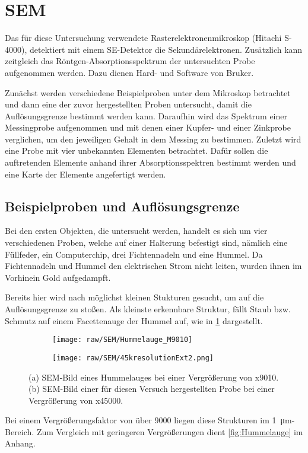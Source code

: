 \section{SEM}

	Das für diese Untersuchung verwendete Rasterelektronenmikroskop (Hitachi S-4000), detektiert mit einem SE-Detektor die Sekundärelektronen.
	Zusätzlich kann zeitgleich das Röntgen-Absorptionsspektrum der untersuchten Probe aufgenommen werden.
	Dazu dienen Hard- und Software von Bruker\cite{bruker}.

	Zunächst werden verschiedene Beispielproben unter dem Mikroskop betrachtet und dann eine der zuvor hergestellten Proben untersucht, damit die Auflösungsgrenze bestimmt werden kann.
	Daraufhin wird das Spektrum einer Messingprobe aufgenommen und mit denen einer Kupfer- und einer Zinkprobe verglichen, um den jeweiligen Gehalt in dem Messing zu bestimmen.
	Zuletzt wird eine Probe mit vier unbekannten Elementen betrachtet.
	Dafür sollen die auftretenden Elemente anhand ihrer Absorptionsspektren bestimmt werden und eine Karte der Elemente angefertigt werden.

\subsection{Beispielproben und Auflösungsgrenze} %

	Bei den ersten Objekten, die untersucht werden, handelt es sich um vier verschiedenen Proben, welche auf einer Halterung befestigt sind, nämlich eine Füllfeder, ein Computerchip, drei Fichtennadeln und eine Hummel.
	Da Fichtennadeln und Hummel den elektrischen Strom nicht leiten, wurden ihnen im Vorhinein Gold aufgedampft.

	Bereits hier wird nach möglichst kleinen Stukturen gesucht, um auf die Auflösungsgrenze zu stoßen.
	Als kleinste erkennbare Struktur, fällt Staub bzw. Schmutz auf einem Facettenauge der Hummel auf, wie in \cref{fig:Hummelaugex9010} dargestellt.

	\begin{figure}[ht]
		\centering
		\begin{subfigure}[c]{.45\textwidth}
			\centering
			\texttt{[image: raw/SEM/Hummelauge\_M9010]}
			\subcaption{}
			\label{fig:Hummelaugex9010}
		\end{subfigure}
		\begin{subfigure}[c]{.45\textwidth}
			\centering
			\texttt{[image: raw/SEM/45kresolutionExt2.png]}
			\subcaption{}
			\label{fig:45k}
		\end{subfigure}
		\caption{(a) SEM-Bild eines Hummelauges bei einer Vergrößerung von x9010.\\
		(b) SEM-Bild einer für diesen Versuch hergestellten Probe bei einer Vergrößerung von x45000.
		}
		\label{fig:resolution}
	\end{figure}
	Bei einem Vergrößerungsfaktor von über $9000$ liegen diese Strukturen im \SI{1}{\micro\meter}-Bereich.
	Zum Vergleich mit geringeren Vergrößerungen dient \cref{fig:Hummelauge} im Anhang.

